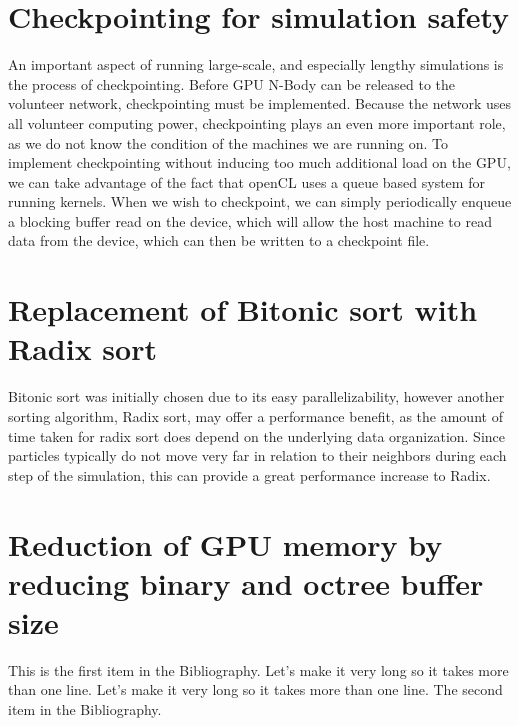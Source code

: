 \documentclass{thesis}
\begin{document}
\section{Checkpointing for simulation safety}
An important aspect of running large-scale, and especially lengthy simulations is the process of checkpointing. Before GPU N-Body can be released to the volunteer network, checkpointing must be implemented. Because the network uses all volunteer computing power, checkpointing plays an even more important role, as we do not know the condition of the machines we are running on. To implement checkpointing without inducing too much additional load on the GPU, we can take advantage of the fact that openCL uses a queue based system for running kernels. When we wish to checkpoint, we can simply periodically enqueue a blocking buffer read on the device, which will allow the host machine to read data from the device, which can then be written to a checkpoint file.
\section{Replacement of Bitonic sort with Radix sort}
Bitonic sort was initially chosen due to its easy parallelizability, however another sorting algorithm, Radix sort, may offer a performance benefit, as the amount of time taken for radix sort does depend on the underlying data organization. Since particles typically do not move very far in relation to their neighbors during each step of the simulation, this can provide a great performance increase to Radix.
\section{Reduction of GPU memory by reducing binary and octree buffer size}


\begin{singlespace}
\begin{thebibliography}{99}
 This is the first item in the Bibliography.
Let's make it very long so it takes more than one line.
Let's make it very long so it takes more than one line.
 The second item in the Bibliography.
\end{thebibliography}
\end{singlespace}
\end{document}
